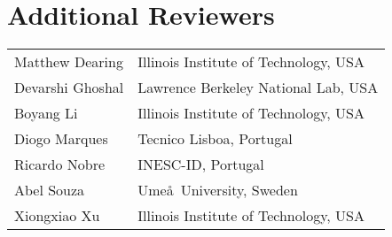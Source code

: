 \documentclass{llncs}
\begin{document}
\section*{Additional Reviewers}
\begin{tabular}{@{}p{5cm}@{}p{7.2cm}@{}}
Matthew Dearing &Illinois Institute of Technology, USA\\
Devarshi Ghoshal &Lawrence Berkeley National Lab, USA\\
Boyang Li &Illinois Institute of Technology, USA\\
Diogo Marques &Tecnico Lisboa, Portugal\\
Ricardo Nobre &INESC-ID, Portugal\\
Abel Souza &Ume\aa~University, Sweden\\
Xiongxiao Xu &Illinois Institute of Technology, USA\\
\end{tabular}
\end{document}
